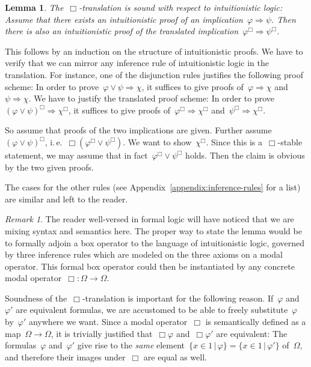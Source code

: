 \documentclass[10pt,reqno,a4paper]{amsbook}
\makeatletter
\theoremstyle{definition}
\theoremstyle{plain}
\newtheorem{lemma}[defn]{Lemma}
\theoremstyle{remark}
\newtheorem{rem}[defn]{Remark}
\newcommand{\?}{\,{:}\,}
\renewcommand{\_}{\mathpunct{.}\,}
\newcommand{\ie}{i.\,e.\@\xspace}
\renewenvironment{proof}[1][\proofname]{\par
  \pushQED{\qed}%
  \normalfont \topsep6\p@\@plus6\p@\relax
  \trivlist
  \item[\hskip\labelsep
        \itshape
    #1\@addpunct{.}]\ignorespaces
}{%
  \popQED\endtrivlist\@endpefalse
}
\makeatother
\begin{document}
\begin{lemma}\label{lemma:box-translation-sound}
The~$\Box$-translation is sound with respect to intuitionistic logic:
Assume that there exists an intuitionistic proof of an
implication~$\varphi \Rightarrow \psi$. Then there is also an intuitionistic
proof of the translated implication~$\varphi^\Box \Rightarrow \psi^\Box$.
\end{lemma}
\begin{proof}This follows by an induction on the structure of intuitionistic
proofs. We have to verify that we can mirror any inference rule of
intuitionistic logic in the translation. For instance, one of the disjunction
rules justifies the following proof scheme: In order to prove~$\varphi \vee
\psi \Rightarrow \chi$, it suffices to give proofs of~$\varphi \Rightarrow
\chi$ and~$\psi \Rightarrow \chi$. We have to justify the translated proof
scheme: In order to prove~$(\varphi \vee \psi)^\Box \Rightarrow \chi^\Box$, it
suffices to give proofs of~$\varphi^\Box \Rightarrow \chi^\Box$ and~$\psi^\Box
\Rightarrow \chi^\Box$.

So assume that proofs of the two implications are given. Further
assume~$(\varphi \vee \psi)^\Box$, \ie~$\Box(\varphi^\Box \vee \psi^\Box)$.
We want to show~$\chi^\Box$. Since this is a~$\Box$-stable statement, we may
assume that in fact~$\varphi^\Box \vee \psi^\Box$ holds. Then the claim is
obvious by the two given proofs.

The cases for the other rules (see Appendix~\ref{appendix:inference-rules} for
a list) are similar and left to the reader.\end{proof}

\begin{rem}The reader well-versed in formal logic will have noticed that we are
mixing syntax and semantics here. The proper way to state the lemma would be
to formally adjoin a box operator to the language of intuitionistic logic,
governed by three inference rules which are modeled on the three axioms on a
modal operator. This formal box operator could then be instantiated by any
concrete modal operator~$\Box : \Omega \to \Omega$.\end{rem}

Soundness of the~$\Box$-translation is important for the following reason.
If~$\varphi$ and~$\varphi'$ are equivalent formulas, we are
accustomed to be able to freely substitute~$\varphi$ by~$\varphi'$ anywhere we
want. Since a modal operator~$\Box$ is semantically defined as a map~$\Omega
\to \Omega$, it is trivially justified that~$\Box\varphi$ and~$\Box\varphi'$
are equivalent: The formulas~$\varphi$ and~$\varphi'$ give rise to the
\emph{same} element~$\{x \in 1 \,|\, \varphi\} = \{x \in 1 \,|\, \varphi'\}$
of~$\Omega$, and therefore their images under~$\Box$ are equal as well.
\end{document}
